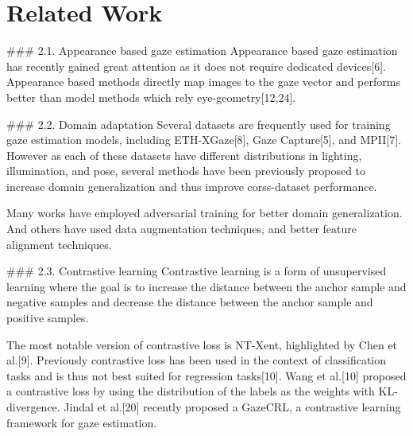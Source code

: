 \section{Related Work}
\label{sec:related}
### 2.1. Appearance based gaze estimation
Appearance based gaze estimation has recently gained great attention as it does not require dedicated devices[6]. Appearance based methods directly map images to the gaze vector and performs better than model methods which rely eye-geometry[12,24]. 

### 2.2. Domain adaptation
Several datasets are frequently used for training gaze estimation models, including ETH-XGaze[8], Gaze Capture[5], and MPII[7]. However as each of these datasets have different distributions in lighting, illumination, and pose, several methods have been previously proposed to increase domain generalization and thus improve corss-dataset performance. 

Many works have employed adversarial training for better domain generalization. And others have used data augmentation techniques, and better feature alignment techniques. 

### 2.3. Contrastive learning
Contrastive learning is a form of unsupervised learning where the goal is to increase the distance between the anchor sample and negative samples and decrease the distance between the anchor sample and positive samples. 

The most notable version of contrastive loss is NT-Xent, highlighted by Chen et al.[9]. Previously contrastive loss has been used in the context of classification tasks and is thus not best suited for regression tasks[10]. Wang et al.[10] proposed a contrastive loss by using the distribution of the labels as the weights with KL-divergence. Jindal et al.[20] recently proposed a GazeCRL, a contrastive learning framework for gaze estimation. 
